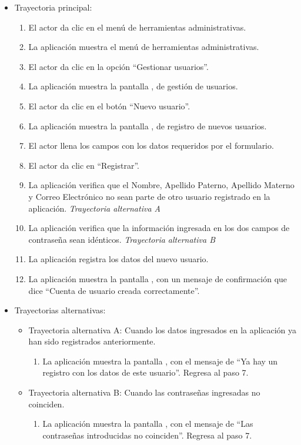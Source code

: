 			\begin{itemize}
				\item Trayectoria principal:
					\begin{enumerate}
						\item El actor da clic en el menú de herramientas administrativas.
						\item La aplicación muestra el menú de herramientas administrativas.
						\item El actor da clic en la opción ``Gestionar usuarios''.
						\item La aplicación muestra la pantalla , de gestión de usuarios.
						\item El actor da clic en el botón ``Nuevo usuario''.
						\item La aplicación muestra la pantalla , de registro de nuevos usuarios.
						\item El actor llena los campos con los datos requeridos por el formulario.
						\item El actor da clic en ``Registrar''.
						\item La aplicación verifica que el Nombre, Apellido Paterno, Apellido Materno y Correo Electrónico no sean parte de otro usuario registrado en la aplicación. \textsl{Trayectoria alternativa A}
						\item La aplicación verifica que la información ingresada en los dos campos de contraseña sean idénticos. \textsl{Trayectoria alternativa B}
						\item La aplicación registra los datos del nuevo usuario.
						\item La aplicación muestra la pantalla , con un mensaje de confirmación que dice ``Cuenta de usuario creada correctamente''.
					\end{enumerate}
				\item Trayectorias alternativas:
					\begin{itemize}
						\item Trayectoria alternativa A: Cuando los datos ingresados en la aplicación ya han sido registrados anteriormente.
							\begin{enumerate}
								\item La aplicación muestra la pantalla , con el mensaje de ``Ya hay un registro con los datos de este usuario''. Regresa al paso 7.
							\end{enumerate}
						\item Trayectoria alternativa B: Cuando las contraseñas ingresadas no coinciden.
							\begin{enumerate}
								\item La aplicación muestra la pantalla , con el mensaje de ``Las contraseñas introducidas no coinciden''. Regresa al paso 7.
							\end{enumerate}
					\end{itemize}
			\end{itemize}

